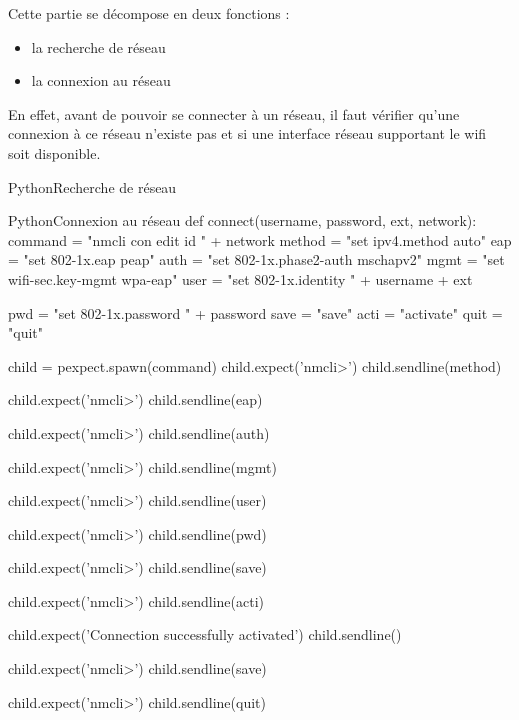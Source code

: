 Cette partie se décompose en deux fonctions :
\begin{itemize}
	\item la recherche de réseau
	\item la connexion au réseau
\end{itemize}

En effet, avant de pouvoir se connecter à un réseau, il faut vérifier qu'une connexion à ce réseau n'existe pas et si une interface réseau supportant le wifi soit disponible.

\begin{listingsbox}{Python}{Recherche de réseau}

\end{listingsbox}


\begin{listingsbox}{Python}{Connexion au réseau}
def connect(username, password, ext, network):
	command = "nmcli con edit id " + network
	method = "set ipv4.method auto"
	eap = "set 802-1x.eap peap"
	auth = "set 802-1x.phase2-auth mschapv2"
	mgmt = "set wifi-sec.key-mgmt wpa-eap"
	user = "set 802-1x.identity " + username + ext
	
	pwd = "set 802-1x.password " + password
	save = "save"
	acti = "activate"
	quit = "quit"
	
	child = pexpect.spawn(command)
	child.expect('nmcli>')
	child.sendline(method)
	
	child.expect('nmcli>')
	child.sendline(eap)
	
	child.expect('nmcli>')
	child.sendline(auth)
	
	child.expect('nmcli>')
	child.sendline(mgmt)
	
	child.expect('nmcli>')
	child.sendline(user)
	
	child.expect('nmcli>')
	child.sendline(pwd)
	
	child.expect('nmcli>')
	child.sendline(save)
	
	child.expect('nmcli>')
	child.sendline(acti)
	
	child.expect('Connection successfully activated')
	child.sendline()
	
	child.expect('nmcli>')
	child.sendline(save)
	
	child.expect('nmcli>')
	child.sendline(quit)
	
\end{listingsbox}

